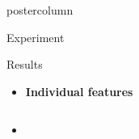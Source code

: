 \documentclass[final]{beamer}
\begin{document}
\begin{frame}
\begin{columns}
\begin{column}{.49\textwidth}
\begin{beamercolorbox}[center,wd=\textwidth]{postercolumn}
\begin{minipage}[T]{.95\textwidth}
{\begin{block}{Experiment}
\begin{itemize}
             \end{itemize}
            \end{block}
            \vfill
            \begin{block}{Results}
            \begin{itemize}
            	 \item \textbf{\color{orounam} Individual features}
            	 \item[]        
              \begin{columns}
            	 	\begin{column}{.47\textwidth}
            	 		\\
            	 	\end{column}
            	 	\begin{column}{.47\textwidth}
            	 		\\

\end{column}
\end{columns}
\end{itemize}
\end{block}}
\end{minipage}
\end{beamercolorbox}
\end{column}
\end{columns}
\end{frame}
\end{document}
